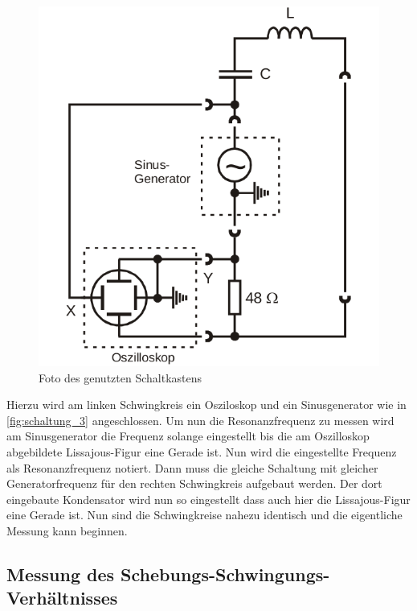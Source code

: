 \begin{figure}
    \centering
    \includegraphics[width=\textwidth/2]{images/schaltung_3.png}
    \caption{Foto des genutzten Schaltkastens}
    \label{fig:schaltung_3}
\end{figure}

Hierzu wird am linken Schwingkreis ein Osziloskop und ein Sinusgenerator wie in \autoref{fig:schaltung_3} angeschlossen. 
Um nun die Resonanzfrequenz zu messen wird am Sinusgenerator die Frequenz solange eingestellt bis die am Oszilloskop abgebildete Lissajous-Figur eine Gerade ist. Nun wird die eingestellte Frequenz als Resonanzfrequenz notiert.
Dann muss die gleiche Schaltung mit gleicher Generatorfrequenz für den rechten Schwingkreis aufgebaut werden.
Der dort eingebaute Kondensator wird nun so eingestellt dass auch hier die Lissajous-Figur eine Gerade ist. Nun sind die Schwingkreise nahezu identisch und die eigentliche Messung kann beginnen.

\subsection{Messung des Schebungs-Schwingungs-Verhältnisses}

